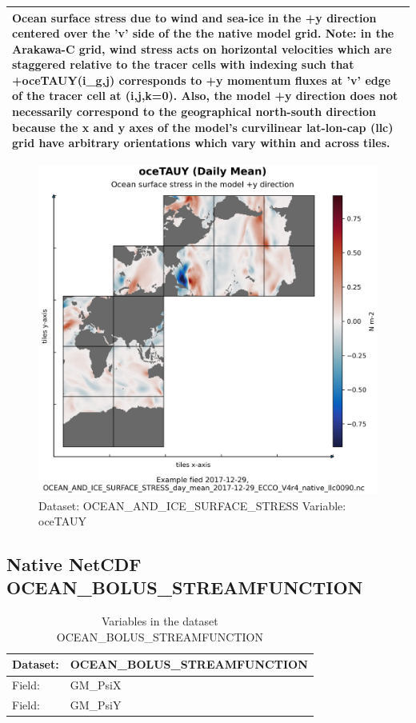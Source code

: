 \begin{longtable}{|p{}|p{}|p{}|p{}|}
\multicolumn{4}{|p{1\textwidth}|}{Ocean surface stress due to wind and sea-ice in the +y direction centered over the 'v' side of the the native model grid. Note: in the Arakawa-C grid, wind stress acts on horizontal velocities which are staggered relative to the tracer cells with indexing such that +oceTAUY(i\_g,j) corresponds to +y momentum fluxes at 'v' edge of the tracer cell at (i,j,k=0). Also, the model +y direction does not necessarily correspond to the geographical north-south direction because the x and y axes of the model's curvilinear lat-lon-cap (llc) grid have arbitrary orientations which vary within and across tiles.} \\ \hline
\end{longtable}

\begin{figure}[H]
\centering
\includegraphics[width=\textwidth]{../images/plots/native_plots/Ocean_and_Sea-Ice_Surface_Stress/oceTAUY.png}
\caption{Dataset: OCEAN\_AND\_ICE\_SURFACE\_STRESS Variable: oceTAUY}
\label{tab:table-OCEAN_AND_ICE_SURFACE_STRESS_oceTAUY-Plot}
\end{figure}
\pagebreak
\subsection{Native NetCDF OCEAN\_BOLUS\_STREAMFUNCTION}
\newp
\begin{longtable}{|p{}|p{}|}
\caption{Variables in the dataset OCEAN\_BOLUS\_STREAMFUNCTION}
\label{tab:table-OCEAN_BOLUS_STREAMFUNCTION-fields} \\ 
\hline \endhead \hline \endfoot
\rowcolor{lightgray} \textbf{Dataset:} & \textbf{OCEAN\_BOLUS\_STREAMFUNCTION} \\ \hline
Field: &GM\_PsiX \\ \hline
Field: &GM\_PsiY \\ \hline
\end{longtable}

